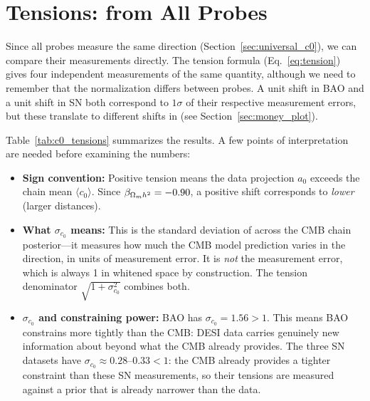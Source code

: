 
\section{\czero Tensions: \omh from All Probes}
\label{sec:c0_tensions}


Since all probes measure the same \czero direction (Section~\ref{sec:universal_c0}), we can compare their \czero measurements directly. The tension formula (Eq.~\ref{eq:tension}) gives four independent measurements of the same quantity, although we need to remember that the \czero normalization differs between probes. A unit shift in BAO \czero and a unit shift in SN \czero both correspond to $1\sigma$ of their respective measurement errors, but these translate to different shifts in \omh (see Section~\ref{sec:money_plot}).

Table~\ref{tab:c0_tensions} summarizes the results. A few points of interpretation are needed before examining the numbers:

\begin{itemize}
\item \textbf{Sign convention:} Positive tension means the data projection $a_0$ exceeds the chain mean $\langle c_0 \rangle$. Since $\beta_{\Omega_m h^2} = -0.90$, a positive \czero shift corresponds to \emph{lower} \omh (larger distances).

\item \textbf{What $\sigma_{c_0}$ means:} This is the standard deviation of \czero across the CMB chain posterior---it measures how much the CMB model prediction varies in the \czero direction, in units of measurement error. It is \emph{not} the measurement error, which is always 1 in whitened space by construction. The tension denominator $\sqrt{1 + \sigma_{c_0}^2}$ combines both.

\item \textbf{$\sigma_{c_0}$ and constraining power:} BAO has $\sigma_{c_0} = 1.56 > 1$. This means BAO constrains \omh more tightly than the CMB: DESI data carries genuinely new information about \omh beyond what the CMB already provides. The three SN datasets have $\sigma_{c_0} \approx 0.28$--$0.33 < 1$: the CMB already provides a tighter constraint than these SN measurements, so their \czero tensions are measured against a prior that is already narrower than the data.
\end{itemize}

